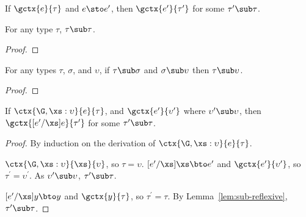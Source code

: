 \begin{theorem}[Preservation]\label{th:preservation}
  If $\gctx{e}{\tau}$ and $e \sto e^\prime$, then $\gctx{e^\prime}{\tau^\prime}$
  for some $\tau^\prime \sub \tau$.

  \begin{lemma}\label{lem:sub-reflexive}
    For any type $\tau$, $\tau \sub \tau$.

    \begin{proof}

    \end{proof}
  \end{lemma}

  \begin{lemma}\label{lem:sub-transitive}
    For any types $\tau$, $\sigma$, and $\upsilon$, if $\tau \sub \sigma$ and
    $\sigma \sub \upsilon$ then $\tau \sub \upsilon$.

    \begin{proof}

    \end{proof}
  \end{lemma}

  \begin{lemma}\label{lem:preservation}
    If $\ctx{\G, \xs : \upsilon}{e}{\tau}$, and
    $\gctx{e^\prime}{\upsilon^\prime}$ where $\upsilon^\prime \sub \upsilon$,
    then $\gctx{[e^\prime/\xs]e}{\tau^\prime}$ for some $\tau^\prime \sub \tau$.

    \begin{proof}
      By induction on the derivation of $\ctx{\G, \xs : \upsilon}{e}{\tau}$.

      $\ctx{\G, \xs : \upsilon}{\xs}{\upsilon}$, so $\tau = \upsilon$.
      $[e^\prime/\xs]\xs \bto e^\prime$ and $\gctx{e^\prime}{\upsilon^\prime}$,
      so $\tau^\prime = \upsilon^\prime$.  As $\upsilon^\prime \sub \upsilon$,
      $\tau^\prime \sub \tau$.

      $[e^\prime/\xs]y \bto y$ and $\gctx{y}{\tau}$, so $\tau^\prime = \tau$.
      By Lemma~\ref{lem:sub-reflexive}, $\tau^\prime \sub \tau$.


\end{proof}
\end{lemma}
\end{theorem}
